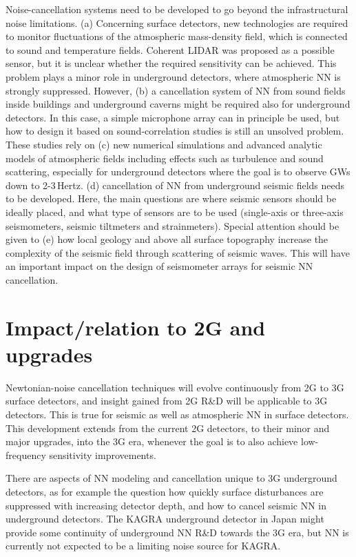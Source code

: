 Noise-cancellation systems need to be developed 
to go beyond the infrastructural noise limitations. (a) Concerning surface detectors, new technologies are required to monitor fluctuations of the atmospheric mass-density field, which is connected to sound and temperature fields. Coherent LIDAR was proposed as a possible sensor, but it is unclear whether the required sensitivity can be achieved. This problem plays a minor role in underground detectors, where atmospheric NN is strongly suppressed. However, (b) a cancellation system of NN from sound fields inside buildings and underground caverns might be required also for underground detectors. In this case, a simple microphone array can in principle be used, but how to design it based on sound-correlation studies is still an unsolved problem. These studies rely on (c) new numerical simulations and advanced analytic models of atmospheric fields including effects such as turbulence and sound scattering, especially for underground detectors where the goal is to observe GWs down to 2-3\,Hertz. (d) cancellation of NN from underground seismic fields needs to be developed. Here, the main questions are where seismic sensors should be ideally placed, and what type of sensors are to be used (single-axis or three-axis seismometers, seismic tiltmeters and strainmeters). Special attention should be given to (e) how local geology and above all surface topography increase the complexity of the seismic field through scattering of seismic waves. This will have an important impact on 
the design of seismometer arrays for seismic NN cancellation.

\section{Impact/relation to 2G and upgrades}
Newtonian-noise cancellation techniques will evolve continuously from 2G to 3G surface detectors, and insight gained from 2G R\&D will be applicable to 3G detectors. This is true for seismic as well as atmospheric NN in surface detectors. This development extends from the current 2G detectors, to their minor and major upgrades, into the 3G era, whenever the goal is to also achieve low-frequency sensitivity improvements. 

There are aspects of NN modeling and cancellation unique to 3G underground detectors, as for example the question how quickly surface disturbances are suppressed with increasing detector depth, and how to cancel seismic NN in underground detectors. The KAGRA underground detector in Japan might 
provide some continuity of underground NN R\&D towards the 3G era, but NN is currently not expected to be a limiting noise source for KAGRA.

